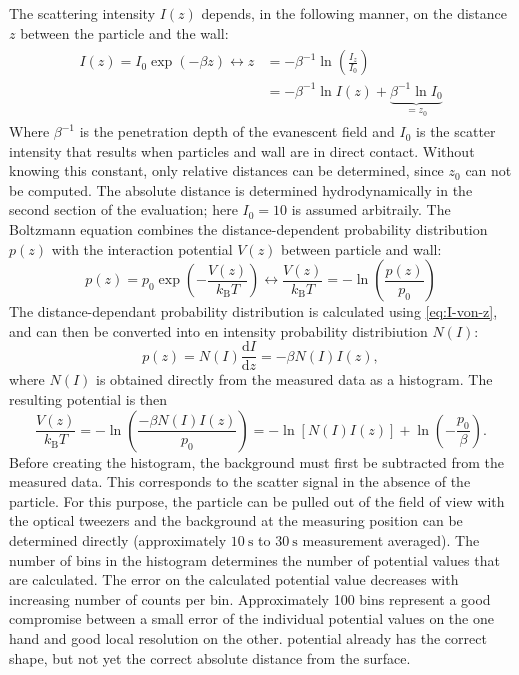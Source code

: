 \documentclass[.../bericht]{subfilies}
\begin{document}
      The scattering intensity $I(z)$ depends, in the following manner, on the distance $z$ between the particle and the wall:
      \begin{align}
        \begin{split}
          I(z)=I_0\exp\left( -\beta z \right) \leftrightarrow z&=-\beta^{-1}\ln\left(\frac{I_z}{I_0}\right)\\
          &=-\beta^{-1}\ln I(z) + \underbrace{\beta^{-1}\ln I_0}_{=z_0}
        \end{split}
        \label{eq:I-von-z}
      \end{align}
      Where $\beta^{-1}$ is the penetration depth of the evanescent field and $I_0$ is the scatter intensity that results when particles and wall are in direct contact. Without knowing this constant, only relative distances can be determined, since $z_0$ can not be computed. The absolute distance is determined hydrodynamically in the second section of the evaluation; here $I_0 = 10$ is assumed arbitraily. The Boltzmann equation combines the distance-dependent probability distribution $p(z)$ with the interaction potential $V(z)$ between particle and wall:
      \begin{equation*}
        p(z)=p_0\exp\left( -\frac{V(z)}{k_\mathrm{B}T}\right) \leftrightarrow \frac{V(z)}{k_\mathrm{B}T}=-\ln\left(\frac{p(z)}{p_0}\right)
      \end{equation*}
      The distance-dependant probability distribution is calculated using \cref{eq:I-von-z}, and can then be converted into en intensity probability distribiution $N(I)$:
      \begin{equation*}
        p(z)=N(I)\frac{\mathrm{d}I}{\mathrm{d}z}=-\beta N(I)I(z),
      \end{equation*}
      where $N(I)$ is obtained directly from the measured data as a histogram. The resulting potential is then
      \begin{equation}
        \frac{V(z)}{k_\mathrm{B}T}=-\ln\left(\frac{-\beta N(I)I(z)}{p_0}\right)=-\ln\left[ N(I)I(z) \right]+\ln\left( -\frac{p_0}{\beta}\right).
        \label{eq:potential}
      \end{equation}
      Before creating the histogram, the background must first be subtracted from the measured data. This corresponds to the scatter signal in the absence of the particle. For this purpose, the particle can be pulled out of the field of view with the optical tweezers and the background at the measuring position can be determined directly (approximately $\SI{10}{\second}$ to $\SI{30}{\second}$ measurement averaged). The number of bins in the histogram determines the number of potential values that are calculated. The error on the calculated potential value decreases with increasing number of counts per bin. Approximately 100 bins represent a good compromise between a small error of the individual potential values on the one hand and good local resolution on the other.  potential already has the correct shape, but not yet the correct absolute distance from the surface.
\end{document}
